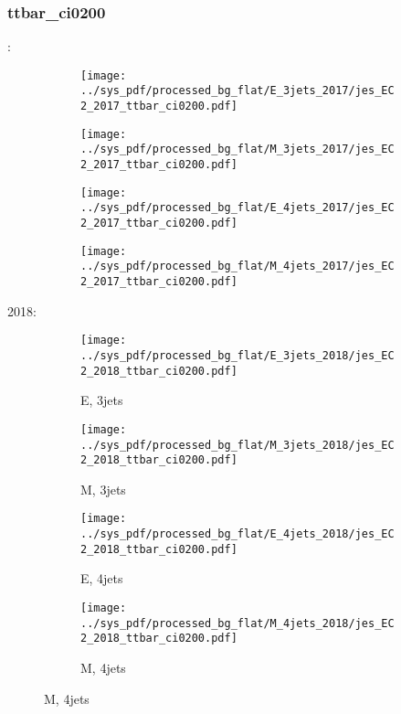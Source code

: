 \documentclass{beamer}
\begin{document}
\begin{frame}
\frametitle{ttbar_ci0200}
\fontsize{5}{1}:
\begin{figure}
\centering
\begin{subfigure}[b]{0.24\textwidth}
\texttt{[image: ../sys\_pdf/processed\_bg\_flat/E\_3jets\_2017/jes\_EC2\_2017\_ttbar\_ci0200.pdf]}
\end{subfigure}
\begin{subfigure}[b]{0.24\textwidth}
\texttt{[image: ../sys\_pdf/processed\_bg\_flat/M\_3jets\_2017/jes\_EC2\_2017\_ttbar\_ci0200.pdf]}
\end{subfigure}
\begin{subfigure}[b]{0.24\textwidth}
\texttt{[image: ../sys\_pdf/processed\_bg\_flat/E\_4jets\_2017/jes\_EC2\_2017\_ttbar\_ci0200.pdf]}
\end{subfigure}
\begin{subfigure}[b]{0.24\textwidth}
\texttt{[image: ../sys\_pdf/processed\_bg\_flat/M\_4jets\_2017/jes\_EC2\_2017\_ttbar\_ci0200.pdf]}
\end{subfigure}
\end{figure}
2018:
\begin{figure}
\centering
\begin{subfigure}[b]{0.24\textwidth}
\texttt{[image: ../sys\_pdf/processed\_bg\_flat/E\_3jets\_2018/jes\_EC2\_2018\_ttbar\_ci0200.pdf]}
\captionsetup{font=tiny}
\caption{E, 3jets}
\end{subfigure}
\begin{subfigure}[b]{0.24\textwidth}
\texttt{[image: ../sys\_pdf/processed\_bg\_flat/M\_3jets\_2018/jes\_EC2\_2018\_ttbar\_ci0200.pdf]}
\captionsetup{font=tiny}
\caption{M, 3jets}
\end{subfigure}
\begin{subfigure}[b]{0.24\textwidth}
\texttt{[image: ../sys\_pdf/processed\_bg\_flat/E\_4jets\_2018/jes\_EC2\_2018\_ttbar\_ci0200.pdf]}
\captionsetup{font=tiny}
\caption{E, 4jets}
\end{subfigure}
\begin{subfigure}[b]{0.24\textwidth}
\texttt{[image: ../sys\_pdf/processed\_bg\_flat/M\_4jets\_2018/jes\_EC2\_2018\_ttbar\_ci0200.pdf]}
\captionsetup{font=tiny}
\caption{M, 4jets}
\end{subfigure}
\end{figure}
\end{frame}
\end{document}
